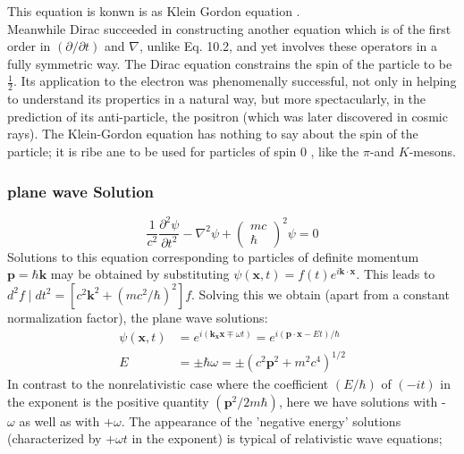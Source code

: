 This equation is konwn is as Klein Gordon equation .\\
 Meanwhile Dirac succeeded in constructing another equation which is of the first order in $(\partial / \partial t)$ and $\nabla$, unlike Eq. 10.2, and yet involves these operators in a fully symmetric way. The Dirac equation constrains the spin of the particle to be $\frac{1}{2}$. Its application to the electron was phenomenally successful, not only in helping to understand its propertics in a natural way, but more spectacularly, in the prediction of its anti-particle, the positron (which was later discovered in cosmic rays). The Klein-Gordon equation has nothing to say about the spin of the particle; it is ribe ane to be used for particles of spin 0 , like the $\pi$-and $K$-mesons.\\
 \subsubsection{plane wave Solution}
 $$
 \frac{1}{c^{2}} \frac{\partial^{2} \psi}{\partial t^{2}}-\nabla^{2} \psi+\left(\begin{array}{c}
 m c \\
 \hbar
 \end{array}\right)^{2} \psi=0
 $$
 Solutions to this equation corresponding to particles of definite momentum $\mathbf{p}=\hbar \mathbf{k}$ may be obtained by substituting $\psi(\mathbf{x}, t)=f(t) e^{i \mathbf{k} \cdot \mathbf{x}} .$ This leads to $d^{2} f \mid d t^{2}=\left[c^{2} \mathbf{k}^{2}+\left(m c^{2} / \hbar\right)^{2}\right] f$. Solving this we obtain (apart from a constant normalization factor), the plane wave solutions:
 $$
 \begin{aligned}
 \psi(\mathbf{x}, t) &=e^{i\left(\mathbf{k}_{\mathbf{x}} \mathbf{x} \mp \omega t\right)}=e^{i(\mathbf{p} \cdot \mathbf{x}-E t) / \hbar} \\
 E &=\pm \hbar \omega=\pm\left(c^{2} \mathbf{p}^{2}+m^{2} c^{4}\right)^{1 / 2}
 \end{aligned}
 $$
 In contrast to the nonrelativistic case where the coefficient $(E / \hbar)$ of $(-i t)$ in the exponent is the positive quantity $\left(\mathbf{p}^{2} / 2 m \hbar\right)$, here we have solutions with - $\omega$ as well as with $+\omega$. The appearance of the 'negative energy' solutions (characterized by $+\omega t$ in the exponent) is typical of relativistic wave equations;
